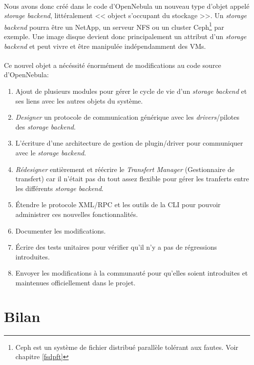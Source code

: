 \paragraph*{}
Nous avons donc créé dans le code d'OpenNebula un nouveau type d'objet appelé \emph{storage backend}, littéralement << object s'occupant du stockage >>.
Un \emph{storage backend} pourra être un NetApp, un serveur NFS ou un cluster Ceph\footnote{Ceph est un système de fichier distribué parallèle tolérant aux fautes.
Voir chapitre \ref{fsdpft}} par exemple. Une image disque devient donc principalement un attribut d'un
\emph{storage backend} et peut vivre et être manipulée indépendamment des VMs.


\paragraph*{}
Ce nouvel objet a nécéssité énormément de modifications au code source d'OpenNebula:
\begin{enumerate}
	\item Ajout de plusieurs modules pour gérer le cycle de vie d'un \emph{storage backend} et ses liens avec les autres objets du système.
	\item \textsl{Designer} un protocole de communication générique avec les \emph{drivers}/pilotes des \emph{storage backend}.
	\item L'écriture d'une architecture de gestion de plugin/driver pour communiquer avec le \emph{storage backend}.
	\item \textsl{Rédesigner} entièrement et réécrire le \emph{Transfert Manager} (Gestionnaire de transfert) car il n'était pas du tout assez flexible
		pour gérer les tranferts entre les différents \emph{storage backend}.
	\item Étendre le protocole XML/RPC et les outils de la CLI pour pouvoir administrer ces nouvelles fonctionnalités.
	\item Documenter les modifications.
	\item Écrire des tests unitaires pour vérifier qu'il n'y a pas de régressions introduites.
	\item Envoyer les modifications à la communauté pour qu'elles soient introduites et maintenues officiellement dans le projet.
\end{enumerate}

\section{Bilan}

